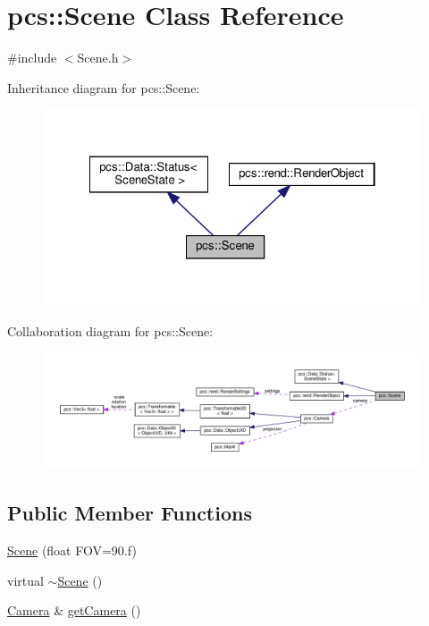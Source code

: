 \hypertarget{classpcs_1_1Scene}{}\section{pcs\+:\+:Scene Class Reference}
\label{classpcs_1_1Scene}


{\ttfamily \#include $<$Scene.\+h$>$}



Inheritance diagram for pcs\+:\+:Scene\+:\nopagebreak
\begin{figure}[H]
\begin{center}
\leavevmode
\includegraphics[width=322pt]{classpcs_1_1Scene__inherit__graph}
\end{center}
\end{figure}


Collaboration diagram for pcs\+:\+:Scene\+:\nopagebreak
\begin{figure}[H]
\begin{center}
\leavevmode
\includegraphics[width=350pt]{classpcs_1_1Scene__coll__graph}
\end{center}
\end{figure}
\subsection*{Public Member Functions}
\begin{DoxyCompactItemize}
\item 
\hyperlink{classpcs_1_1Scene_a04a77b0c67dc42c11d5c50a07ab3a06f}{Scene} (float F\+OV=90.f)
\item 
virtual \hyperlink{classpcs_1_1Scene_a106aca266becd518d47821e08a87cf6f}{$\sim$\+Scene} ()
\item 
\hyperlink{classpcs_1_1Camera}{Camera} \& \hyperlink{classpcs_1_1Scene_a94be9eaa37239c5c0a854af148cf0225}{get\+Camera} ()
\end{DoxyCompactItemize}
